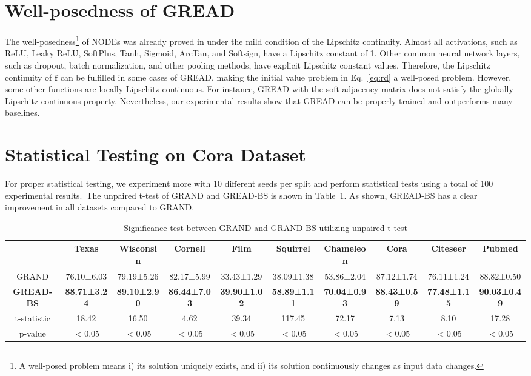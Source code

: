 \documentclass{article}
\theoremstyle{plain}
\theoremstyle{definition}
\theoremstyle{remark}
\newcommand{\std}{\scriptsize{}}
\begin{document}
\section{Well-posedness of GREAD}
The well-posedness\footnote{A well-posed problem means i) its solution uniquely exists, and ii) its solution continuously changes as input data changes.} of NODEs was already proved in \citet[Theorem 1.3]{lyons2004differential} under the mild condition of the Lipschitz continuity. Almost all activations, such as ReLU, Leaky ReLU, SoftPlus, Tanh, Sigmoid, ArcTan, and Softsign, have a Lipschitz constant of 1. Other common neural network layers, such as dropout, batch normalization, and other pooling methods, have explicit Lipschitz constant values. Therefore, the Lipschitz continuity of $\mathbf{f}$ can be fulfilled in some cases of GREAD, making the initial value problem in Eq.~\eqref{eq:rd} a well-posed problem. However, some other functions are locally Lipschitz continuous. For instance, GREAD with the soft adjacency matrix does not satisfy the globally Lipschitz continuous property. Nevertheless, our experimental results show that GREAD can be properly trained and outperforms many baselines.


\clearpage

\section{Statistical Testing on Cora Dataset}
For proper statistical testing, we experiment more with 10 different seeds per split and perform statistical tests using a total of 100 experimental results. The unpaired t-test of GRAND and GREAD-BS is shown in Table~\ref{tab:ttest}. As shown, GREAD-BS has a clear improvement in all datasets compared to GRAND.

\begin{table}[!ht]
    \centering
    \setlength{\tabcolsep}{2pt}
    \caption{Significance test between GRAND and GRAND-BS utilizing unpaired t-test}
    \begin{tabular}{cccccccccc}
    \toprule
        ~ & Texas & Wisconsin & Cornell & Film & Squirrel & Chameleon & Cora & Citeseer & Pubmed \\ \midrule
        GRAND & 76.10\std{±6.03} & 79.19\std{±5.26} & 82.17\std{±5.99} & 33.43\std{±1.29} & 38.09\std{±1.38} & 53.86\std{±2.04} & 87.12\std{±1.74} & 76.11\std{±1.24} & 88.82\std{±0.50} \\ 
        \textbf{GREAD-BS} & \textbf{88.71\std{±3.24}} & \textbf{89.10\std{±2.90}} & \textbf{86.44\std{±7.03}} & \textbf{39.90\std{±1.02}} & \textbf{58.89\std{±1.11}} & \textbf{70.04\std{±0.93}} & \textbf{88.43\std{±0.59}} & \textbf{77.48\std{±1.15}} & \textbf{90.03\std{±0.49}} \\ \midrule
        t-statistic & 18.42 & 16.50 & 4.62 & 39.34 & 117.45 & 72.17 & 7.13 & 8.10 & 17.28 \\ 
        p-value & $<$0.05 & $<$0.05 & $<$0.05 & $<$0.05 & $<$0.05 & $<$0.05 & $<$0.05 & $<$0.05 & $<$0.05 \\ \bottomrule
    \end{tabular}
    \label{tab:ttest}
\end{table}
\end{document}
